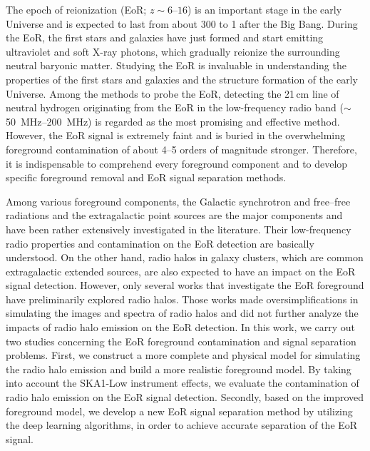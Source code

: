 \begin{englishabstract}

The epoch of reionization (EoR; $z \sim \numrange{6}{16}$) is
an important stage in the early Universe and is expected to last
from about \SI{300}{\Myr} to \SI{1}{\Gyr} after the Big Bang.
During the EoR, the first stars and galaxies have just formed and
start emitting ultraviolet and soft X-ray photons,
which gradually reionize the surrounding neutral baryonic matter.
Studying the EoR is invaluable in understanding the properties of the
first stars and galaxies and the structure formation of the early
Universe.
Among the methods to probe the EoR, detecting the 21\,cm line of
neutral hydrogen originating from the EoR in the low-frequency
radio band ($\sim$\,\SIrange{50}{200}{\MHz}) is regarded as
the most promising and effective method.
However, the EoR signal is extremely faint and is buried in the
overwhelming foreground contamination of about 4--5 orders of magnitude
stronger.
Therefore, it is indispensable to comprehend every foreground
component and to develop specific foreground removal and EoR signal
separation methods.

Among various foreground components, the Galactic synchrotron and
free--free radiations and the extragalactic point sources are the
major components and have been rather extensively investigated in
the literature.
Their low-frequency radio properties and contamination on the EoR
detection are basically understood.
On the other hand, radio halos in galaxy clusters, which are common
extragalactic extended sources, are also expected to have an impact on
the EoR signal detection.
However, only several works that investigate the EoR foreground
have preliminarily explored radio halos.
Those works made oversimplifications in simulating the images and
spectra of radio halos and did not further analyze the impacts of
radio halo emission on the EoR detection.
In this work, we carry out two studies concerning the EoR foreground
contamination and signal separation problems.
First, we construct a more complete and physical model for simulating
the radio halo emission and build a more realistic foreground model.
By taking into account the SKA1-Low instrument effects, we evaluate
the contamination of radio halo emission on the EoR signal detection.
Secondly, based on the improved foreground model, we develop a new EoR
signal separation method by utilizing the deep learning algorithms,
in order to achieve accurate separation of the EoR signal.


\end{englishabstract}
